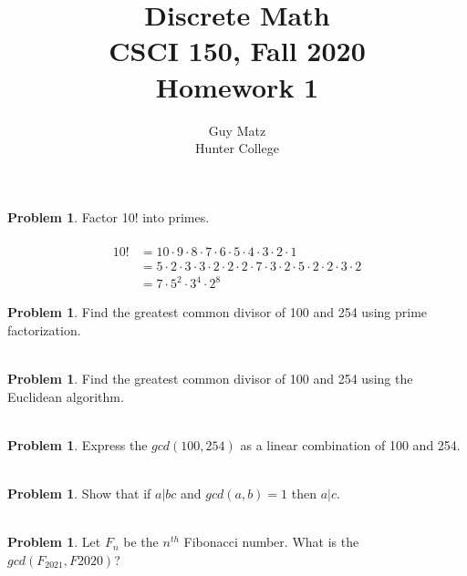 \documentclass[10pt,leqno ]{article}
\title{Discrete Math\\
CSCI 150, Fall 2020\\
Homework 1}
\author{Guy Matz \\
Hunter College}
\theoremstyle{definition}
\newtheorem{problem}[theorem]{Problem}
\begin{document}
\begin{problem} Factor 10! into primes.
\\\\
\Large
\begin{align*}
10! &= 10 \cdot 9 \cdot 8 \cdot 7  \cdot  6  \cdot  5  \cdot 4 \cdot 3 \cdot 2 \cdot 1\\
    &= 5 \cdot 2 \cdot 3 \cdot 3 \cdot 2 \cdot 2 \cdot 2 \cdot 7 \cdot 3 \cdot 2 \cdot 5 \cdot 2 \cdot 2 \cdot 3 \cdot 2\\
    &= 7 \cdot 5^2 \cdot 3^4 \cdot 2^8
\end{align*}
\end{problem}
\newpage

\begin{problem} Find the greatest common divisor of 100 and 254 using prime factorization.
\\\\
\Large
\end{problem}
\newpage

\begin{problem} Find  the  greatest  common  divisor  of  100  and  254  using  the  Euclidean algorithm.
\\\\
\Large
\end{problem}
\newpage

\begin{problem} Express the $gcd(100,254)$ as a linear combination of 100 and 254.
\\\\
\Large
\end{problem}
\newpage

\begin{problem} Show that if $a|bc$ and $gcd(a, b) = 1$ then $a|c$.
\\\\
\Large
\end{problem}
\newpage

\begin{problem} Let $F_n$ be the $n^{th}$ Fibonacci number.  What is the $gcd(F_{2021}, F{2020})$?
\\\\
\Large
\end{problem}
\newpage
\end{document}

